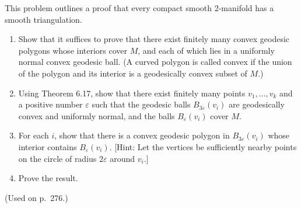 \begin{exercise}
\label{prob:triangulation-2manifold}
This problem outlines a proof that every compact smooth 2-manifold has a smooth triangulation.
\begin{enumerate}
\item[(a)] Show that it suffices to prove that there exist finitely many convex geodesic polygons whose interiors cover $M$, and each of which lies in a uniformly normal convex geodesic ball. (A curved polygon is called convex if the union of the polygon and its interior is a geodesically convex subset of $M$.)
\item[(b)] Using Theorem 6.17, show that there exist finitely many points $v_1, \ldots, v_k$ and a positive number $\varepsilon$ such that the geodesic balls $B_{3\varepsilon}(v_i)$ are geodesically convex and uniformly normal, and the balls $B_\varepsilon(v_i)$ cover $M$.
\item[(c)] For each $i$, show that there is a convex geodesic polygon in $B_{3\varepsilon}(v_i)$ whose interior contains $B_\varepsilon(v_i)$. [Hint: Let the vertices be sufficiently nearby points on the circle of radius $2\varepsilon$ around $v_i$.]
\item[(d)] Prove the result.
\end{enumerate}
(Used on p.\ 276.)
\end{exercise}
